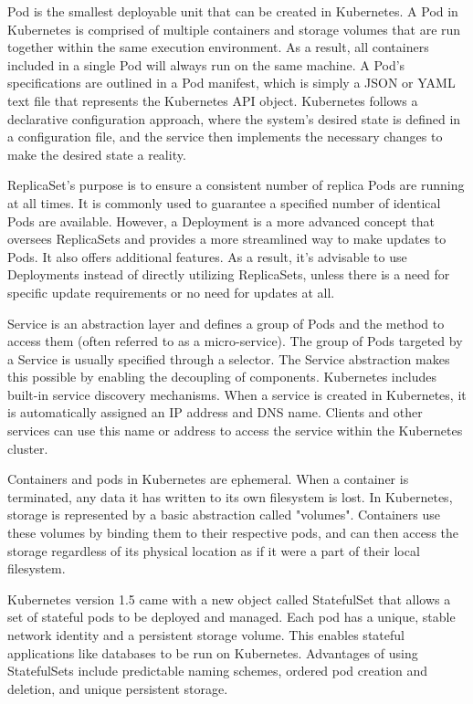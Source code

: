 \label{chap:kubeConcepts}

Pod is the smallest deployable unit that can be created in Kubernetes. \cite{docuKubePods} A Pod in Kubernetes is comprised of multiple containers and storage volumes that are run together within the same execution environment. As a result, all containers included in a single Pod will always run on the same machine. \cite{kubeUpAndRunningPods}
A Pod's specifications are outlined in a Pod manifest, which is simply a JSON or YAML text file that represents the Kubernetes API object. Kubernetes follows a declarative configuration approach, where the system's desired state is defined in a configuration file, and the service then implements the necessary changes to make the desired state a reality. \cite{docuKubeStaticPod}

ReplicaSet's purpose is to ensure a consistent number of replica Pods are running at all times. It is commonly used to guarantee a specified number of identical Pods are available. However, a Deployment is a more advanced concept that oversees ReplicaSets and provides a more streamlined way to make updates to Pods. It also offers additional features. As a result, it's advisable to use Deployments instead of directly utilizing ReplicaSets, unless there is a need for specific update requirements or no need for updates at all. \cite{docuKubeReplicaset}

Service is an abstraction layer and defines a group of Pods and the method to access them (often referred to as a micro-service). The group of Pods targeted by a Service is usually specified through a selector. The Service abstraction makes this possible by enabling the decoupling of components. \cite{docuKubeSevice} Kubernetes includes built-in service discovery mechanisms. When a service is created in Kubernetes, it is automatically assigned an IP address and DNS name. Clients and other services can use this name or address to access the service within the Kubernetes cluster. \cite{docuKubeSevice}

Containers and pods in Kubernetes are ephemeral. When a container is terminated, any data it has written to its own filesystem is lost. In Kubernetes, storage is represented by a basic abstraction called "volumes". Containers use these volumes by binding them to their respective pods, and can then access the storage regardless of its physical location as if it were a part of their local filesystem. \cite{masteringKubernetesStorage}

Kubernetes version 1.5 came with a new object called StatefulSet that allows a set of stateful pods to be deployed and managed. Each pod has a unique, stable network identity and a persistent storage volume. This enables stateful applications like databases to be run on Kubernetes. Advantages of using StatefulSets include predictable naming schemes, ordered pod creation and deletion, and unique persistent storage. \cite{docuKubeStatefulSet} \cite{githubKube15}

